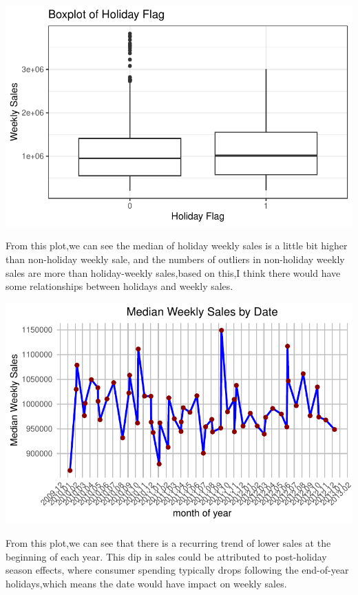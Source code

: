 \documentclass[
  letterpaper,
  DIV=11,
  numbers=noendperiod]{scrartcl}
\begin{document}
\includegraphics{678final_files/figure-pdf/unnamed-chunk-6-1.pdf}

From this plot,we can see the median of holiday weekly sales is a little
bit higher than non-holiday weekly sale, and the numbers of outliers in
non-holiday weekly sales are more than holiday-weekly sales,based on
this,I think there would have some relationships between holidays and
weekly sales.

\includegraphics{678final_files/figure-pdf/unnamed-chunk-7-1.pdf}

From this plot,we can see that there is a recurring trend of lower sales
at the beginning of each year. This dip in sales could be attributed to
post-holiday season effects, where consumer spending typically drops
following the end-of-year holidays,which means the date would have
impact on weekly sales.
\end{document}
